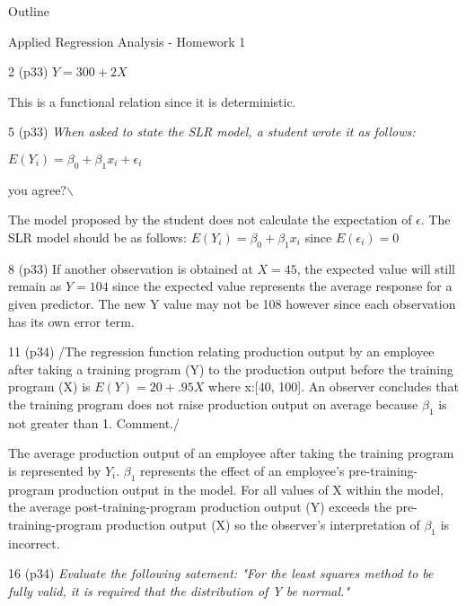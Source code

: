 \documentclass[11pt]{article}
\author{Dustin}
\date{\today}
\title{}
\begin{document}
\begin{frame}{Outline}
\tableofcontents
\end{frame}


\begin{frame}[label={sec:orgb1fb7b8},fragile]{Applied Regression Analysis - Homework 1}
 \begin{block}{2 (p33)}
\(Y = 300 + 2X\)

This is a functional relation since it is deterministic.
\end{block}

\begin{block}{5 (p33)}
\emph{When asked to state the SLR model, a student wrote it as follows:}

\(E(Y_i) = \beta_0 + \beta_1 x_i + \epsilon_i\)

\Do you agree?$\backslash$

The model proposed by the student does not calculate the expectation of
\(\epsilon\). The SLR model should be as follows:
\(E(Y_i) = \beta_0 + \beta_1 x_i\) since \(E(\epsilon_i) = 0\)
\end{block}

\begin{block}{8 (p33)}
If another observation is obtained at \(X = 45\), the expected value will still
remain as \(Y = 104\) since the expected value represents the average response for
a given predictor. The new Y value may not be 108 however since each observation
has its own error term.
\end{block}

\begin{block}{11 (p34)}
/The regression function relating production output by an employee after taking
a training  program (Y) to the production output before the training program (X)
is \(E(Y) = 20 + .95X\) where x:[40, 100]. An observer concludes that the training
program does not raise production output on average because \(\beta_1\) is not
greater than 1. Comment./

The average production output of an employee after taking the training program
is represented by \(Y_i\). \(\beta_1\) represents the effect of an employee's
pre-training-program production output in the model. For all values of X within
the model, the average post-training-program production output (Y) exceeds the
pre-training-program production output (X) so the observer's interpretation of
\(\beta_1\) is incorrect.
\end{block}

\begin{block}{16 (p34)}
\emph{Evaluate the following satement: "For the least squares method to be fully
valid, it is required that the distribution of Y be normal."}


\end{block}
\end{frame}
\end{document}
